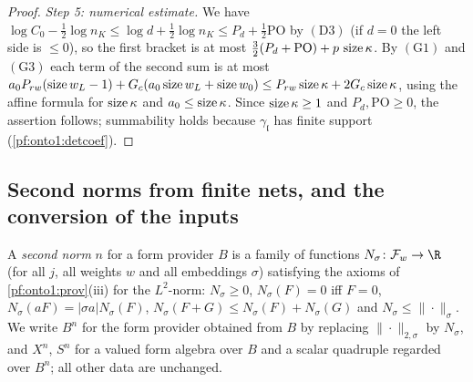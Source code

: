 \begin{proof}
\emph{Step 5: numerical estimate.} We have $\log C_0-\frac12\log n_K\le\log d+\frac12\log n_K\le P_d+\frac12\mathrm{PO}$ by
$(\mathrm D3)$ (if $d=0$ the left side is $\le0$), so the first bracket is at most $\tfrac32(P_d+\mathrm{PO})+p\,\operatorname{size}\kappa$. By $(\mathrm G1)$ and $(\mathrm G3)$ each term of the second sum is at most
$a_0P_{rw}(\operatorname{size} w_L-1)+G_c(a_0\operatorname{size} w_L+\operatorname{size} w_0)\le P_{rw}\operatorname{size}\kappa+2G_c\operatorname{size}\kappa$, using the
affine formula for $\operatorname{size}\kappa$ and $a_0\le\operatorname{size}\kappa$. Since $\operatorname{size}\kappa\ge1$ and $P_d,\mathrm{PO}\ge0$, the
assertion follows; summability holds because $\gamma_{\mathfrak l}$ has finite support (\cref{pf:onto1:detcoef}).
\end{proof}

\subsection{Second norms from finite nets, and the conversion of the inputs}\label{sec:pf:onto1:net}

\begin{definition}\label{pf:onto1:secnorm}
A \emph{second norm} $n$ for a form provider $B$ is a family of functions $N_\sigma\colon\mathcal F_w\to\R$ (for all
$j$, all weights $w$ and all embeddings $\sigma$) satisfying the axioms of \cref{pf:onto1:prov}(iii) for the
$L^2$-norm: $N_\sigma\ge0$, $N_\sigma(F)=0$ iff $F=0$, $N_\sigma(aF)=|\sigma a|N_\sigma(F)$, $N_\sigma(F+G)\le
N_\sigma(F)+N_\sigma(G)$ and $N_\sigma\le\|\cdot\|_\sigma$. We write $B^n$ for the form provider obtained from $B$ by
replacing $\|\cdot\|_{2,\sigma}$ by $N_\sigma$, and $X^n$, $S^n$ for a valued form algebra over $B$ and a scalar quadruple
regarded over $B^n$; all other data are unchanged.
\end{definition}

